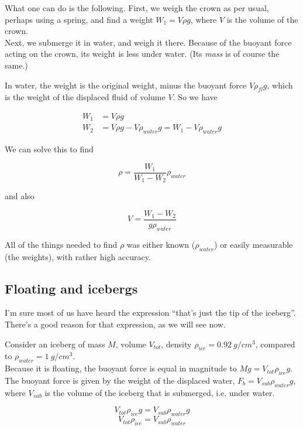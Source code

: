 What one can do is the following. First, we weigh the crown as per usual, perhaps using a spring, and find a weight $W_1 = V \rho g$, where $V$ is the volume of the crown.\\
Next, we submerge it in water, and weigh it there. Because of the buoyant force acting on the crown, its weight is less under water. (Its \emph{mass} is of course the same.)

In water, the weight is the original weight, minus the buoyant force $V \rho_{fl} g$, which is the weight of the displaced fluid of volume $V$. So we have

\begin{align}
W_1 &= V \rho g\\
W_2 &= V \rho g - V \rho_{water} g = W_1 - V \rho_{water} g
\end{align}

We can solve this to find

\begin{equation}
\rho = \frac{W_1}{W_1 - W_2} \rho_{water}
\end{equation}

and also

\begin{equation}
V = \frac{W_1 - W_2}{g \rho_{water}}
\end{equation}

All of the things needed to find $\rho$ was either known ($\rho_{water}$) or easily measurable (the weights), with rather high accuracy.

\subsection{Floating and icebergs}

I'm sure most of us have heard the expression ``that's just the tip of the iceberg''. There's a good reason for that expression, as we will see now.

Consider an iceberg of mass $M$, volume $V_{tot}$, density $\rho_{ice} = \SI{0.92}{g/cm^3}$, compared to $\rho_{water} = \SI{1}{g/cm^3}$.\\
Because it is floating, the buoyant force is equal in magnitude to $M g = V_{tot} \rho_{ice} g$. The buoyant force is given by the weight of the displaced water, $F_b = V_{sub} \rho_{water} g$, where $V_{sub}$ is the volume of the iceberg that is submerged, i.e. under water.

\begin{equation}
V_{tot} \rho_{ice} g = V_{sub} \rho_{water} g
\end{equation}
\begin{equation}
V_{tot} \rho_{ice} = V_{sub} \rho_{water}
\end{equation}

